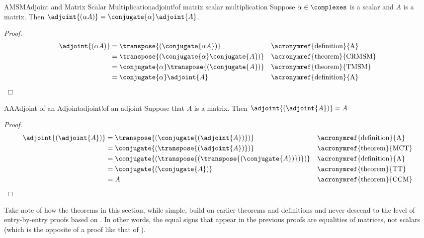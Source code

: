 %
\begin{theorem}{AMSM}{Adjoint and Matrix Scalar Multiplication}{adjoint!of matrix scalar multiplication}
Suppose $\alpha\in\complexes$ is a scalar and $A$ is a matrix.  Then $\adjoint{\left(\alpha A\right)}=\conjugate{\alpha}\adjoint{A}$.
\end{theorem}
%
\begin{proof}
%
\begin{align*}
\adjoint{\left(\alpha A\right)}
&=\transpose{\left(\conjugate{\alpha A}\right)}
&&\text{\acronymref{definition}{A}}\\
%
&=\transpose{\left(\conjugate{\alpha}\conjugate{A}\right)}
&&\text{\acronymref{theorem}{CRMSM}}\\
%
&=\conjugate{\alpha}\transpose{\left(\conjugate{A}\right)}
&&\text{\acronymref{theorem}{TMSM}}\\
%
&=\conjugate{\alpha}\adjoint{A}
&&\text{\acronymref{definition}{A}}
%
\end{align*}
%
\end{proof}
%
\begin{theorem}{AA}{Adjoint of an Adjoint}{adjoint!of an adjoint}
Suppose that $A$ is a matrix.  Then $\adjoint{\left(\adjoint{A}\right)}=A$
\end{theorem}
%
\begin{proof}
%
\begin{align*}
\adjoint{\left(\adjoint{A}\right)}
&=\transpose{\left(\conjugate{\left(\adjoint{A}\right)}\right)}
&&\text{\acronymref{definition}{A}}\\
%
&=\conjugate{\left(\transpose{\left(\adjoint{A}\right)}\right)}
&&\text{\acronymref{theorem}{MCT}}\\
%
&=\conjugate{\left(\transpose{\left(\transpose{\left(\conjugate{A}\right)}\right)}\right)}
&&\text{\acronymref{definition}{A}}\\
%
&=\conjugate{\left(\conjugate{A}\right)}
&&\text{\acronymref{theorem}{TT}}\\
%
&=A
&&\text{\acronymref{theorem}{CCM}}
%
\end{align*}
%
\end{proof}
%
Take note of how the theorems in this section, while simple, build on earlier theorems and definitions and never descend to the level of entry-by-entry proofs based on .  In other words, the equal signs that appear in the previous proofs are equalities of matrices, not scalars (which is the opposite of a proof like that of ).
%




